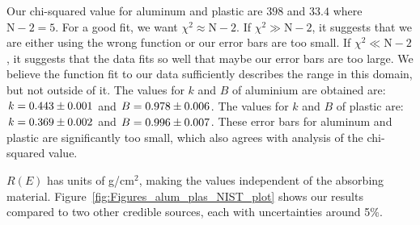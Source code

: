  Our chi-squared value for aluminum and plastic are $398$ and $33.4$ where $\text{N}-2 =5$.  For a good fit, we want $\chi^2\approx \text{N}-2$.  If $\chi^2 \gg \text{N}-2$, it suggests that we are either using the wrong function or our error bars are too small.  If $\chi^2 \ll \text{N}-2$, it suggests that the data fits so well that maybe our error bars are too large.\cite{garcia2000numerical}  We believe the function fit to our data sufficiently describes the range in this domain, but not outside of it.  
 The values for $k$ and $B$ of aluminium are obtained are: $k = 0.443 \pm 0.001$ and $B = 0.978 \pm 0.006$. The values for $k$ and $B$ of plastic are: $k = 0.369 \pm 0.002$ and $B = 0.996 \pm 0.007$.  These error bars for aluminum and plastic are significantly too small, which also agrees with analysis of the chi-squared value.

 $R(E)$ has units of g/cm$^2$, making the values independent of the absorbing material. Figure~\ref{fig:Figures_alum_plas_NIST_plot} shows our results compared to two other credible sources\cite{RevModPhys.24.28,nistData}, each with uncertainties around 5\%.  

